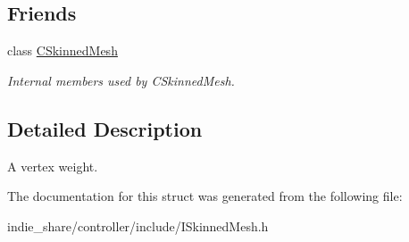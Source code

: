 \subsection*{Friends}
\begin{DoxyCompactItemize}
\item 
\mbox{\label{structirr_1_1scene_1_1ISkinnedMesh_1_1SWeight_a9fe6767b50580f2235b3a86dda1e5b7c}} 
class \hyperlink{structirr_1_1scene_1_1ISkinnedMesh_1_1SWeight_a9fe6767b50580f2235b3a86dda1e5b7c}{C\+Skinned\+Mesh}
\begin{DoxyCompactList}\small\item\em Internal members used by C\+Skinned\+Mesh. \end{DoxyCompactList}\end{DoxyCompactItemize}


\subsection{Detailed Description}
A vertex weight. 

The documentation for this struct was generated from the following file\+:\begin{DoxyCompactItemize}
\item 
indie\+\_\+share/controller/include/I\+Skinned\+Mesh.\+h\end{DoxyCompactItemize}
